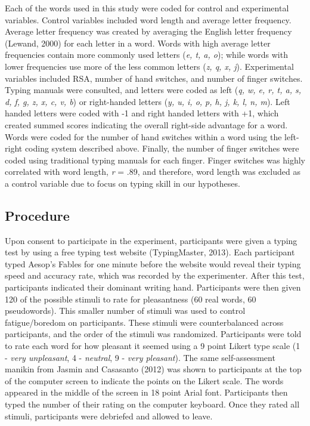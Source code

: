 \documentclass[
  english,
  man]{apa7}
\begin{document}
Each of the words used in this study were coded for control and experimental variables. Control variables included word length and average letter frequency. Average letter frequency was created by averaging the English letter frequency (Lewand, 2000) for each letter in a word. Words with high average letter frequencies contain more commonly used letters (\emph{e, t, a, o}); while words with lower frequencies use more of the less common letters (\emph{z, q, x, j}). Experimental variables included RSA, number of hand switches, and number of finger switches. Typing manuals were consulted, and letters were coded as left (\emph{q, w, e, r, t, a, s, d, f, g, z, x, c, v, b}) or right-handed letters (\emph{y, u, i, o, p, h, j, k, l, n, m}). Left handed letters were coded with -1 and right handed letters with +1, which created summed scores indicating the overall right-side advantage for a word. Words were coded for the number of hand switches within a word using the left-right coding system described above. Finally, the number of finger switches were coded using traditional typing manuals for each finger. Finger switches was highly correlated with word length, \emph{r} = .89, and therefore, word length was excluded as a control variable due to focus on typing skill in our hypotheses.

\hypertarget{procedure}{%
\subsection{Procedure}\label{procedure}}

Upon consent to participate in the experiment, participants were given a typing test by using a free typing test website (TypingMaster, 2013). Each participant typed Aesop's Fables for one minute before the website would reveal their typing speed and accuracy rate, which was recorded by the experimenter. After this test, participants indicated their dominant writing hand. Participants were then given 120 of the possible stimuli to rate for pleasantness (60 real words, 60 pseudowords). This smaller number of stimuli was used to control fatigue/boredom on participants. These stimuli were counterbalanced across participants, and the order of the stimuli was randomized. Participants were told to rate each word for how pleasant it seemed using a 9 point Likert type scale (1 - \emph{very unpleasant}, 4 - \emph{neutral}, 9 - \emph{very pleasant}). The same self-assessment manikin from Jasmin and Casasanto (2012) was shown to participants at the top of the computer screen to indicate the points on the Likert scale. The words appeared in the middle of the screen in 18 point Arial font. Participants then typed the number of their rating on the computer keyboard. Once they rated all stimuli, participants were debriefed and allowed to leave.
\end{document}
